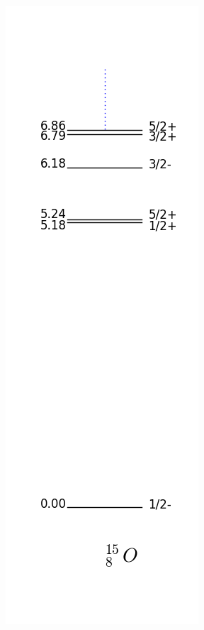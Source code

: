 \documentclass[12pt]{article}
\begin{document}
\begin{figure}
\begin{center}
\includegraphics[scale=0.4]{images/levels_15O.png}

\end{center}
\end{figure}
\end{document}
